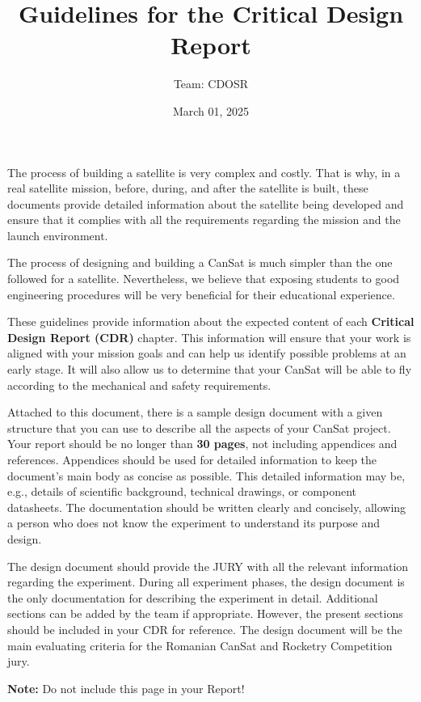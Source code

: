 \documentclass[11pt]{article}
\title{Guidelines for the Critical Design Report
}
\author{Team: CDOSR}
\date{March 01, 2025}
\begin{document}
\cansattitle{}{}{}



The process of building a satellite is very complex and costly. That is why, in a real satellite mission, before, during, and after the satellite is built, these documents provide detailed information about the satellite being developed and ensure that it complies with all the requirements regarding the mission and the launch environment.

The process of designing and building a CanSat is much simpler than the one followed for a satellite. Nevertheless, we believe that exposing students to good engineering procedures will be very beneficial for their educational experience.

These guidelines provide information about the expected content of each \textbf{Critical Design Report (CDR)} chapter. 
This information will ensure that your work is aligned with your mission goals and can help us identify possible problems at an early stage. 
It will also allow us to determine that your CanSat will be able to fly according to the mechanical and safety requirements.

Attached to this document, there is a sample design document with a given structure that you can use to describe all the aspects of your CanSat project. 
Your report should be no longer than \textbf{30 pages}, not including appendices and references. Appendices should be used for detailed information 
to keep the document's main body as concise as possible. This detailed information may be, e.g., details of scientific background, technical drawings, or 
component datasheets. The documentation should be written clearly and concisely, allowing a person who does not know the experiment to understand its purpose and design.

The design document should provide the JURY with all the relevant information regarding the experiment. 
During all experiment phases, the design document is the only documentation for describing the experiment in detail. 
Additional sections can be added by the team if appropriate. However, the present sections should be included in your CDR for reference. The design document will be the main evaluating criteria for the Romanian CanSat and Rocketry Competition jury.

\vspace{3cm}
{\Large{\textbf{Note:} Do not include this page in your Report!}}
\end{document}
